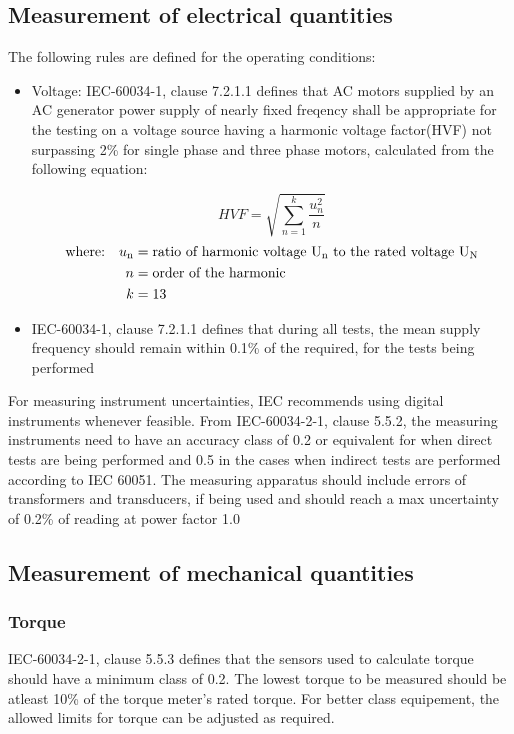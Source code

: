 \subsection{Measurement of electrical quantities}
The following rules are defined for the operating conditions:
\begin{itemize}
	\item Voltage: IEC-60034-1, clause 7.2.1.1 defines that AC motors supplied by an AC generator power supply of nearly fixed freqency shall be appropriate for the testing on a voltage source having a harmonic voltage factor(HVF) not surpassing 2\% for single phase and three phase motors, calculated from the following equation:

\begin{equation}
HVF=\sqrt{\sum\limits_{n=1}^k\frac{u_{n}^2}{n}}
\end{equation}
\begin{align*}
\text{where:}\quad
 u\textsubscript{n}     &=  \text{ratio of harmonic voltage U\textsubscript{n} to the rated voltage U\textsubscript{N}} \\
 n     					&=  \text{order of the harmonic} \\   
 k 						&=  \text{13}
\end{align*}

	\item	IEC-60034-1, clause 7.2.1.1 defines that during all tests, the mean supply frequency should remain within 0.1\% of the required, for the tests being performed
\end{itemize}

For measuring instrument uncertainties, IEC recommends using digital instruments whenever feasible. From IEC-60034-2-1, clause 5.5.2, the measuring instruments need to have an accuracy class of 0.2 or equivalent for when direct tests are being performed and 0.5 in the cases when indirect tests are performed according to IEC 60051. The measuring apparatus should include errors of transformers and transducers, if being used and should reach a max uncertainty of 0.2\% of reading at power factor 1.0
 
\subsection{Measurement of mechanical quantities}

\subsubsection{Torque}
IEC-60034-2-1, clause 5.5.3 defines that the sensors used to calculate torque should have a minimum class of 0.2. The lowest torque to be measured should be atleast 10\% of the torque meter's rated torque. For better class equipement, the allowed limits for torque can be adjusted as required.

